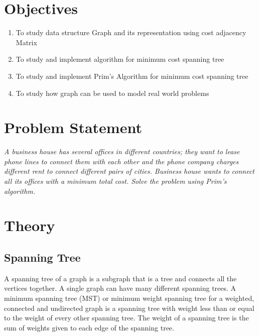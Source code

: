 \documentclass[11pt]{article}
\begin{document}
\tableofcontents
\thispagestyle{empty}
\clearpage

\setcounter{page}{1}

\section{Objectives}
\begin{enumerate}
    \item To study data structure Graph and its representation using cost adjacency Matrix
    \item To study and implement algorithm for minimum cost spanning tree
    \item To study and implement Prim's Algorithm for minimum cost spanning tree
    \item To study how graph can be used to model real world problems
\end{enumerate}

\section{Problem Statement}
\textit{A business house has several offices in different countries; they want to lease phone
    lines to connect them with each other and the phone company charges different rent to
    connect different pairs of cities. Business house wants to connect all its offices with a
    minimum total cost. Solve the problem using Prim's algorithm.}
\section{Theory}


\subsection{Spanning Tree}
A spanning tree of a graph is a subgraph that is a tree and connects all the vertices together. A single graph can have many different spanning trees. A minimum spanning tree (MST) or minimum weight spanning tree for a weighted, connected and undirected graph is a spanning tree with weight less than or equal to the weight of every other spanning tree. The weight of a spanning tree is the sum of weights given to each edge of the spanning tree.
\end{document}
